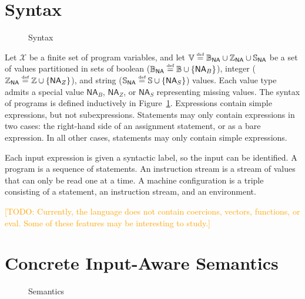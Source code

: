 \documentclass{article}
\newcommand{\defined}{\ensuremath{\stackrel{\mbox{\tiny def}}{=}}\xspace} %
\newcommand{\vars}{\ensuremath{\mathcal{X}}\xspace} %
\newcommand{\vals}{\ensuremath{\mathbb{V}}\xspace} %
\newcommand{\na}{\ensuremath{\mathsf{NA}}\xspace} %
\newcommand{\bvals}{\ensuremath{\mathbb{B}_\na}\xspace} %
\newcommand{\bools}{\ensuremath{\mathbb{B}}\xspace} %
\newcommand{\bna}{\ensuremath{\na_{B}}\xspace} %
\newcommand{\ivals}{\ensuremath{\mathbb{Z}_\na}\xspace} %
\newcommand{\ints}{\ensuremath{\mathbb{Z}}\xspace} %
\newcommand{\ina}{\ensuremath{\na_{Z}}\xspace} %
\newcommand{\svals}{\ensuremath{\mathbb{S}_\na}\xspace} %
\newcommand{\strings}{\ensuremath{\mathbb{S}}\xspace} %
\newcommand{\sna}{\ensuremath{\na_{S}}\xspace} %
\newcommand{\irem}[3]{{\noindent\textcolor{#1}{\textsf{[#2: 
#3]}}}}
\newcommand{\todo}[1]{\irem{orange}{TODO}{#1}}
\begin{document}
\section*{Syntax}

\begin{figure}[th!]
  \begin{center}
    \begin{small}
      \grammartabularSTY{%
        \ottv\ottinterrule%
        \ottse\ottinterrule%
        \otte\ottinterrule%
        \otts\ottinterrule%
        \ottP\ottinterrule%
        \ottE\ottinterrule%
        \ottI\ottinterrule%
        \ottC\ottafterlastrule%
      }
    \end{small}
  \end{center}
  \vspace{-1em}
  \caption{Syntax}\label{fig:syntax}
\end{figure}

Let \vars be a finite set of program variables, and let $\vals\defined\bvals \cup \ivals \cup \svals$ be a set of values partitioned  in sets of boolean ($\bvals \defined \bools \cup \{\bna\} $), integer ($\ivals \defined \ints \cup \{\ina\} $), and string ($\svals \defined \strings \cup \{\sna\} $) values. Each value type admits a special value $\bna$, $\ina$, or $\sna$ representing missing values.
The syntax of programs is defined inductively in Figure~\ref{fig:syntax}.
Expressions contain simple expressions, but not subexpressions. Statements may
only contain expressions in two cases: the right-hand side of an assignment
statement, or as a bare expression. In all other cases, statements may only
contain simple expressions.

Each input expression is given a syntactic label, so the input can be
identified. A program is a sequence of statements. An instruction stream is a
stream of values that can only be read one at a time. A machine configuration
is a triple consisting of a statement, an instruction stream, and an environment.

\todo{Currently, the language does not contain coercions, vectors, functions, or
eval. Some of these features may be interesting to study.}

\section*{Concrete Input-Aware Semantics}

\begin{figure}[th!]
  \begin{center}
    \begin{small}
      \ottdefnevalXXse{}\ottinterrule
      \ottdefnevalXXe{}\ottinterrule
      \ottdefnevalXXs{}
    \end{small}
  \end{center}
  \vspace{-1em}
  \caption{Semantics}\label{fig:semantics}
  \vspace{-1em}
\end{figure}
\end{document}
